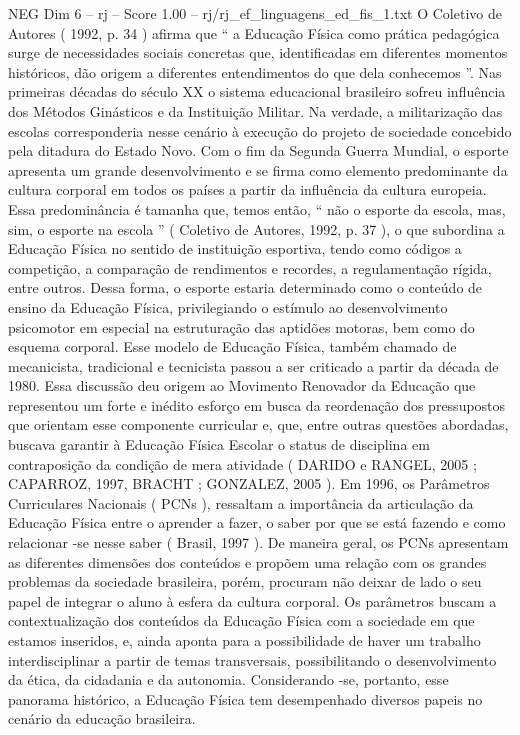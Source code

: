 \begin{textsample}{NEG Dim 6 – rj – Score 1.00 – rj/rj\_ef\_linguagens\_ed\_fis\_1.txt}
O Coletivo de Autores ( 1992, p. 34 ) afirma que “ a Educação Física como prática pedagógica surge de necessidades sociais concretas que, identificadas em diferentes momentos históricos, dão origem a diferentes entendimentos do que dela conhecemos ”.
Nas primeiras décadas do século XX o sistema educacional brasileiro sofreu influência dos Métodos Ginásticos e da Instituição Militar.
Na verdade, a militarização das escolas corresponderia nesse cenário à execução do projeto de sociedade concebido pela ditadura do Estado Novo.
Com o fim da Segunda Guerra Mundial, o esporte apresenta um grande desenvolvimento e se firma como elemento predominante da cultura corporal em todos os países a partir da influência da cultura europeia.
Essa predominância é tamanha que, temos então, “ não o esporte da escola, mas, sim, o esporte na escola ” ( Coletivo de Autores, 1992, p. 37 ), o que subordina a Educação Física no sentido de instituição esportiva, tendo como códigos a competição, a comparação de rendimentos e recordes, a regulamentação rígida, entre outros.
Dessa forma, o esporte estaria determinado como o conteúdo de ensino da Educação Física, privilegiando o estímulo ao desenvolvimento psicomotor em especial na estruturação das aptidões motoras, bem como do esquema corporal.
Esse modelo de Educação Física, também chamado de mecanicista, tradicional e tecnicista passou a ser criticado a partir da década de 1980.
Essa discussão deu origem ao Movimento Renovador da Educação que representou um forte e inédito esforço em busca da reordenação dos pressupostos que orientam esse componente curricular e, que, entre outras questões abordadas, buscava garantir à Educação Física Escolar o status de disciplina em contraposição da condição de mera atividade ( DARIDO e RANGEL, 2005 ; CAPARROZ, 1997, BRACHT ; GONZALEZ, 2005 ).
Em 1996, os Parâmetros Curriculares Nacionais ( PCNs ), ressaltam a importância da articulação da Educação Física entre o aprender a fazer, o saber por que se está fazendo e como relacionar -se nesse saber ( Brasil, 1997 ).
De maneira geral, os PCNs apresentam as diferentes dimensões dos conteúdos e propõem uma relação com os grandes problemas da sociedade brasileira, porém, procuram não deixar de lado o seu papel de integrar o aluno à esfera da cultura corporal.
Os parâmetros buscam a contextualização dos conteúdos da Educação Física com a sociedade em que estamos inseridos, e, ainda aponta para a possibilidade de haver um trabalho interdisciplinar a partir de temas transversais, possibilitando o desenvolvimento da ética, da cidadania e da autonomia.
Considerando -se, portanto, esse panorama histórico, a Educação Física tem desempenhado diversos papeis no cenário da educação brasileira.

\end{textsample}
